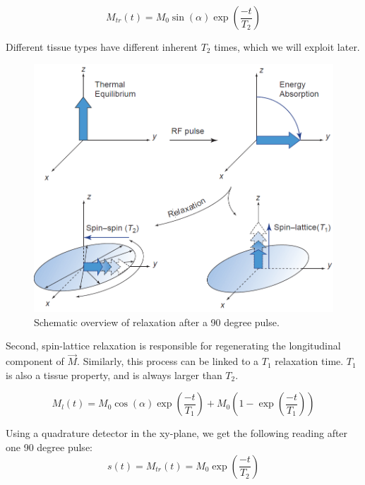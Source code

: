 \begin{equation}
M_{tr}(t) = M_0 \sin(\alpha) \exp\left(\frac{-t}{T_2}\right)
\end{equation}

Different tissue types have different inherent $T_2$ times, which we will
exploit later.

\begin{figure}[ht]
\begin{center}
  \includegraphics[width=\linewidth]{img/relaxation.png}
  \caption{Schematic overview of relaxation after a 90 degree pulse. \cite{suetens}}
  \label{fig:relaxation}
\end{center}
\end{figure}

Second, spin-lattice relaxation is responsible for regenerating the
longitudinal component of $\vec{M}$. Similarly, this process can be linked to a
$T_1$ relaxation time. $T_1$ is also a tissue property, and is always larger
than $T_2$.

\begin{equation}
M_l(t) = M_0 \cos(\alpha) \exp\left(\frac{-t}{T_1}\right) + M_0 \left(1 -
\exp\left(\frac{-t}{T_1}\right)\right)
\end{equation}

Using a quadrature detector in the xy-plane, we get the following reading
after one 90 degree pulse:
\begin{equation}
s(t) = M_{tr}(t) = M_0 \exp\left(\frac{-t}{T_2}\right)
\end{equation}


